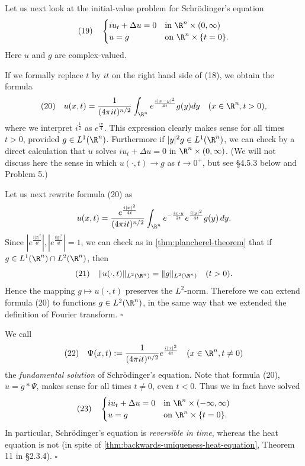 \begin{example}
\label{ex:schrodinger-fundamental-solution}
Let us next look at the initial-value problem for Schr\"odinger's equation
$$(19) \quad \begin{cases} iu_t + \Delta u = 0 & \text{in } \R^n \times (0,\infty) \\ u = g & \text{on } \R^n \times \{t = 0\}. \end{cases}$$
Here $u$ and $g$ are complex-valued.

If we formally replace $t$ by $it$ on the right hand side of (18), we obtain the formula
$$(20) \quad u(x,t) = \frac{1}{(4\pi it)^{n/2}} \int_{\R^n} e^{\frac{i|x-y|^2}{4t}} g(y) dy \quad (x \in \R^n, t > 0),$$
where we interpret $i^{\frac{1}{2}}$ as $e^{\frac{i\pi}{4}}$. This expression clearly makes sense for all times $t > 0$, provided $g \in L^1(\R^n)$. Furthermore if $|y|^2 g \in L^1(\R^n)$, we can check by a direct calculation that $u$ solves $iu_t + \Delta u = 0$ in $\R^n \times (0,\infty)$. (We will not discuss here the sense in which $u(\cdot,t) \to g$ as $t \to 0^+$, but see \S4.5.3 below and Problem 5.)

Let us next rewrite formula (20) as
$$u(x,t) = \frac{e^{\frac{i|x|^2}{4t}}}{(4\pi it)^{n/2}} \int_{\R^n} e^{-\frac{ix \cdot y}{2t}} e^{\frac{i|y|^2}{4t}} g(y)\, dy.$$
Since $|e^{\frac{i|x|^2}{4t}}|, |e^{\frac{i|y|^2}{4t}}| = 1$, we can check as in \cref{thm:plancherel-theorem} that if $g \in L^1(\R^n) \cap L^2(\R^n)$, then
$$(21) \quad \|u(\cdot,t)\|_{L^2(\R^n)} = \|g\|_{L^2(\R^n)} \quad (t > 0).$$
Hence the mapping $g \mapsto u(\cdot,t)$ preserves the $L^2$-norm. Therefore we can extend formula (20) to functions $g \in L^2(\R^n)$, in the same way that we extended the definition of Fourier transform. $\square$
\end{example}

\begin{remark}
\label{rem:schrodinger-time-reversibility}
We call
$$(22) \quad \Psi(x,t) := \frac{1}{(4\pi it)^{n/2}} e^{\frac{i|x|^2}{4t}} \quad (x \in \R^n, t \neq 0)$$
the \textit{fundamental solution} of Schr\"odinger's equation. Note that formula (20), $u = g * \Psi$, makes sense for all times $t \neq 0$, even $t < 0$. Thus we in fact have solved
$$(23) \quad \begin{cases} iu_t + \Delta u = 0 & \text{in } \R^n \times (-\infty, \infty) \\ u = g & \text{on } \R^n \times \{t = 0\}. \end{cases}$$
In particular, Schr\"odinger's equation is \textit{reversible in time}, whereas the heat equation is not (in spite of \cref{thm:backwards-uniqueness-heat-equation}, Theorem 11 in \S2.3.4). $\square$
\end{remark}

